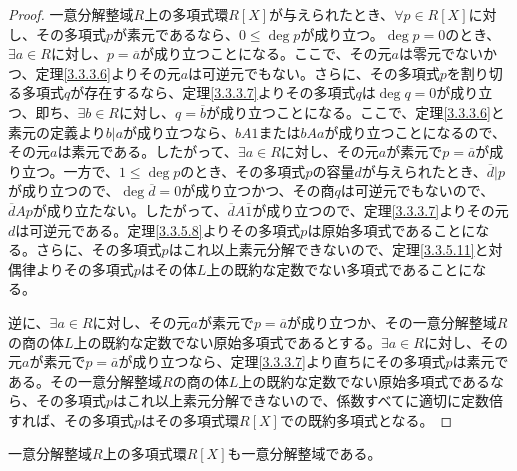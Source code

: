 \documentclass[dvipdfmx]{jsarticle}
\begin{document}
\begin{proof}
一意分解整域$R$上の多項式環$R[ X]$が与えられたとき、$\forall p \in R[ X]$に対し、その多項式$p$が素元であるなら、$0 \leq \deg p$が成り立つ。$\deg p = 0$のとき、$\exists a \in R$に対し、$p = \overline{a}$が成り立つことになる。ここで、その元$a$は零元でないかつ、定理\ref{3.3.3.6}よりその元$a$は可逆元でもない。さらに、その多項式$p$を割り切る多項式$q$が存在するなら、定理\ref{3.3.3.7}よりその多項式$q$は$\deg q = 0$が成り立つ、即ち、$\exists b \in R$に対し、$q = \overline{b}$が成り立つことになる。ここで、定理\ref{3.3.3.6}と素元の定義より$b|a$が成り立つなら、$bA1$または$bAa$が成り立つことになるので、その元$a$は素元である。したがって、$\exists a \in R$に対し、その元$a$が素元で$p = \overline{a}$が成り立つ。一方で、$1 \leq \deg p$のとき、その多項式$p$の容量$d$が与えられたとき、$\overline{d}|p$が成り立つので、$\deg\overline{d} = 0$が成り立つかつ、その商$q$は可逆元でもないので、$\overline{d}Ap$が成り立たない。したがって、$\overline{d}A\overline{1}$が成り立つので、定理\ref{3.3.3.7}よりその元$d$は可逆元である。定理\ref{3.3.5.8}よりその多項式$p$は原始多項式であることになる。さらに、その多項式$p$はこれ以上素元分解できないので、定理\ref{3.3.5.11}と対偶律よりその多項式$p$はその体$L$上の既約な定数でない多項式であることになる。\par
逆に、$\exists a \in R$に対し、その元$a$が素元で$p = \overline{a}$が成り立つか、その一意分解整域$R$の商の体$L$上の既約な定数でない原始多項式であるとする。$\exists a \in R$に対し、その元$a$が素元で$p = \overline{a}$が成り立つなら、定理\ref{3.3.3.7}より直ちにその多項式$p$は素元である。その一意分解整域$R$の商の体$L$上の既約な定数でない原始多項式であるなら、その多項式$p$はこれ以上素元分解できないので、係数すべてに適切に定数倍すれば、その多項式$p$はその多項式環$R[ X]$での既約多項式となる。
\end{proof}
\begin{thm}\label{3.3.5.13}
一意分解整域$R$上の多項式環$R[ X]$も一意分解整域である。
\end{thm}
\end{document}
